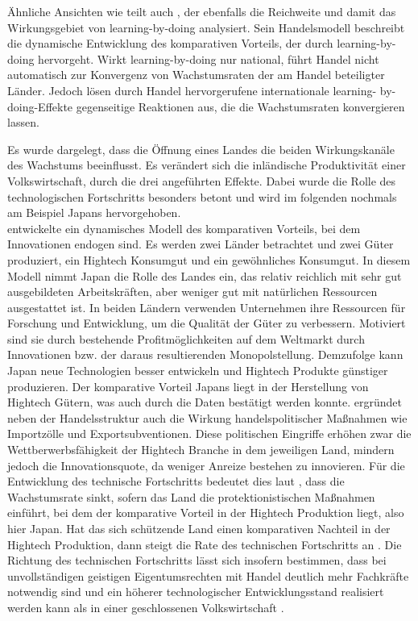 {\"A}hnliche Ansichten wie \citet{Grossman.1995} teilt auch \citet{Krugman.1987}, der ebenfalls die Reichweite und damit das Wirkungsgebiet von learning-by-doing analysiert. Sein Handelsmodell beschreibt die dynamische Entwicklung des komparativen Vorteils, der durch learning-by-doing hervorgeht.  Wirkt learning-by-doing nur national, f{\"u}hrt Handel nicht automatisch zur Konvergenz von Wachstumsraten der am Handel beteiligter L{\"a}nder. Jedoch l{\"o}sen durch Handel hervorgerufene internationale learning- by-doing-Effekte gegenseitige Reaktionen aus, die die Wachstumsraten konvergieren lassen. \newline 


Es wurde dargelegt, dass die {\"O}ffnung eines Landes die beiden Wirkungskan{\"a}le des Wachstums beeinflusst. Es ver{\"a}ndert sich die inl{\"a}ndische Produktivit{\"a}t einer Volkswirtschaft, durch die drei angef{\"u}hrten Effekte. Dabei wurde die Rolle des technologischen Fortschritts besonders betont und wird im folgenden nochmals am Beispiel Japans hervorgehoben.\\


\citet{Grossman.1990} entwickelte ein dynamisches Modell des komparativen Vorteils, bei dem Innovationen endogen sind. Es werden zwei L{\"a}nder betrachtet und zwei G{\"u}ter produziert, ein Hightech Konsumgut und ein gew{\"o}hnliches Konsumgut. In diesem Modell nimmt Japan die Rolle des Landes ein, das relativ reichlich mit sehr gut ausgebildeten Arbeitskr{\"a}ften, aber weniger gut mit nat{\"u}rlichen Ressourcen ausgestattet ist. In beiden L{\"a}ndern verwenden Unternehmen ihre Ressourcen f{\"u}r Forschung und Entwicklung, um die Qualit{\"a}t der G{\"u}ter zu verbessern. Motiviert sind sie durch bestehende Profitm{\"o}glichkeiten auf dem Weltmarkt durch Innovationen bzw. der daraus resultierenden Monopolstellung. Demzufolge kann Japan neue Technologien besser entwickeln und Hightech Produkte g{\"u}nstiger produzieren.  Der komparative Vorteil Japans liegt in der Herstellung von Hightech G{\"u}tern, was auch durch die Daten best{\"a}tigt werden konnte. \citet{Grossman.1990} ergr{\"u}ndet neben der Handelsstruktur auch die Wirkung handelspolitischer Ma{\ss}nahmen wie Importz{\"o}lle und Exportsubventionen. Diese politischen Eingriffe erh{\"o}hen zwar die Wettberwerbsf{\"a}higkeit der Hightech Branche in dem jeweiligen Land, mindern jedoch die Innovationsquote, da weniger Anreize bestehen zu innovieren. F{\"u}r die Entwicklung des technische Fortschritts bedeutet dies laut \citet{Grossman.1990}, dass die Wachstumsrate sinkt, sofern das Land die protektionistischen Ma{\ss}nahmen einf{\"u}hrt, bei dem der komparative Vorteil in der Hightech Produktion liegt, also hier Japan. Hat das sich sch{\"u}tzende Land einen komparativen Nachteil in der Hightech Produktion, dann steigt die Rate des technischen Fortschritts an \citep{Grossman.1990}.
Die Richtung des technischen Fortschritts l{\"a}sst sich insofern bestimmen, dass bei unvollst{\"a}ndigen geistigen Eigentumsrechten mit Handel deutlich mehr Fachkr{\"a}fte notwendig sind und ein h{\"o}herer technologischer Entwicklungsstand realisiert werden kann als in einer geschlossenen Volkswirtschaft \citep{Acemoglu.2003,Thoenig.2003,Epifani.2006}.